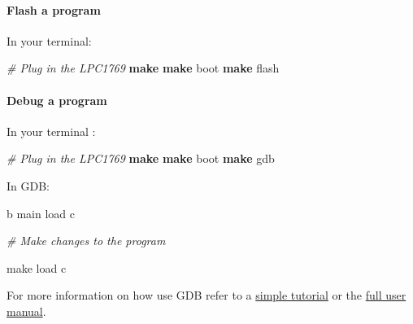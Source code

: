 \documentclass[]{article}
\newenvironment{Shaded}{\begin{snugshade}}{\end{snugshade}}
\newcommand{\KeywordTok}[1]{\textcolor[rgb]{0.13,0.29,0.53}{\textbf{{#1}}}}
\newcommand{\CommentTok}[1]{\textcolor[rgb]{0.56,0.35,0.01}{\textit{{#1}}}}
\newcommand{\NormalTok}[1]{{#1}}
\begin{document}
\paragraph{Flash a program}

In your terminal:

\begin{Shaded}
\begin{Highlighting}[]
    \CommentTok{# Plug in the LPC1769}
    \KeywordTok{make}
    \KeywordTok{make} \NormalTok{boot}
    \KeywordTok{make} \NormalTok{flash}
\end{Highlighting}
\end{Shaded}

\paragraph{Debug a program}

In your terminal :

\begin{Shaded}
\begin{Highlighting}[]
    \CommentTok{# Plug in the LPC1769}
    \KeywordTok{make}
    \KeywordTok{make} \NormalTok{boot}
    \KeywordTok{make} \NormalTok{gdb}
\end{Highlighting}
\end{Shaded}

In GDB:

\begin{Shaded}
\begin{Highlighting}[]
    \NormalTok{b main}
    \NormalTok{load}
    \NormalTok{c}

    \CommentTok{# Make changes to the program}

    \NormalTok{make}
    \NormalTok{load}
    \NormalTok{c}
\end{Highlighting}
\end{Shaded}

For more information on how use GDB refer to a
\href{http://www.cs.cmu.edu/~gilpin/tutorial/}{simple tutorial} or the
\href{https://sourceware.org/gdb/current/onlinedocs/gdb/}{full user
manual}.

\newpage

\todototoc
\listoftodos
\end{document}
